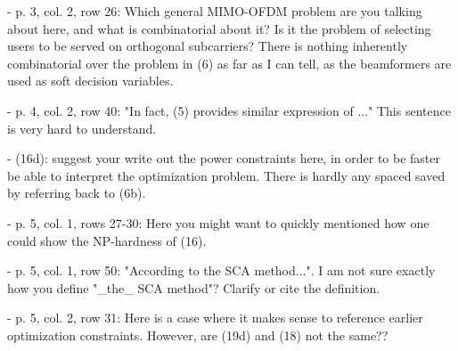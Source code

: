 \begin{itemize}
\begin{itemize}
 - {p. 3, col. 2, row 26: Which general MIMO-OFDM problem are you talking about here, and what is combinatorial about it? Is it the problem of selecting users to be served on orthogonal subcarriers? There is nothing inherently combinatorial over the problem in (6) as far as I can tell, as the beamformers are used as soft decision variables.}

\resp {}

 - {p. 4, col. 2, row 40: "In fact, (5) provides similar expression of ..." This sentence is very hard to understand.}

\resp {}

 - {(16d): suggest your write out the power constraints here, in order to be faster be able to interpret the optimization problem. There is hardly any spaced saved by referring back to (6b).}

\resp {}

 - {p. 5, col. 1, rows 27-30: Here you might want to quickly mentioned how one could show the NP-hardness of (16).}

\resp {} 

 - {p. 5, col. 1, row 50: "According to the SCA method...". I am not sure exactly how you define "\_the\_ SCA method"? Clarify or cite the definition.}

\resp {}

 - {p. 5, col. 2, row 31: Here is a case where it makes sense to reference earlier optimization constraints. However, are (19d) and (18) not the same??}

\resp {}


\end{itemize}
\end{itemize}
